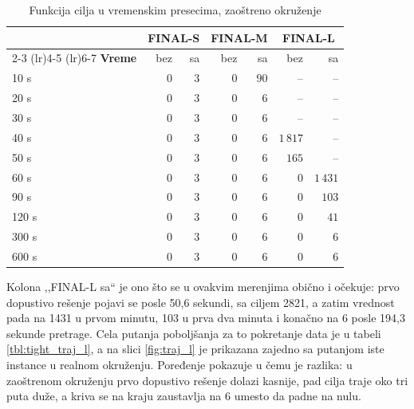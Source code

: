 \documentclass[12pt,oneside]{memoir}
\begin{document}
\begin{table}[ht]
\centering
\caption{Funkcija cilja u vremenskim presecima, zaoštreno okruženje}
\label{tbl:tight_checkpoints}
\begin{tabular}{lrrrrrr}
\toprule
& \multicolumn{2}{c}{\textbf{FINAL-S}}
& \multicolumn{2}{c}{\textbf{FINAL-M}}
& \multicolumn{2}{c}{\textbf{FINAL-L}} \\
\cmidrule(lr){2-3} \cmidrule(lr){4-5} \cmidrule(lr){6-7}
\textbf{Vreme} & bez & sa & bez & sa & bez & sa \\
\midrule
10 s  & $0$ & $3$ & $0$ & $90$ & --       & --       \\
20 s  & $0$ & $3$ & $0$ & $6$  & --       & --       \\
30 s  & $0$ & $3$ & $0$ & $6$  & --       & --       \\
40 s  & $0$ & $3$ & $0$ & $6$  & $1\,817$ & --       \\
50 s  & $0$ & $3$ & $0$ & $6$  & $165$    & --       \\
60 s  & $0$ & $3$ & $0$ & $6$  & $0$      & $1\,431$ \\
90 s  & $0$ & $3$ & $0$ & $6$  & $0$      & $103$    \\
120 s & $0$ & $3$ & $0$ & $6$  & $0$      & $41$     \\
300 s & $0$ & $3$ & $0$ & $6$  & $0$      & $6$      \\
600 s & $0$ & $3$ & $0$ & $6$  & $0$      & $6$      \\
\bottomrule
\end{tabular}
\end{table}

Kolona ,,FINAL-L sa`` je ono što se u ovakvim merenjima obično i očekuje:
prvo dopustivo rešenje pojavi se posle 50,6 sekundi, sa ciljem 2821, a
zatim vrednost pada na 1431 u prvom minutu, 103 u prva dva minuta i
konačno na 6 posle 194,3 sekunde pretrage. Cela putanja poboljšanja za
to pokretanje data je u tabeli \ref{tbl:tight_traj_l}, a na slici
\ref{fig:traj_l} je prikazana zajedno sa putanjom iste instance u
realnom okruženju. Poređenje pokazuje u čemu je razlika:
u zaoštrenom okruženju prvo dopustivo rešenje dolazi kasnije, pad cilja
traje oko tri puta duže, a kriva se na kraju zaustavlja na 6 umesto da
padne na nulu.

\newcommand{\trajRealno}{
  (27.46,3095) (27.66,3053) (27.96,2999) (28.19,2947) (28.63,2824)
  (29.26,2592) (29.53,2444) (29.9,1848) (31.36,1838) (31.55,1557)
  (31.96,1386) (32.21,1380) (34.17,1072) (36.68,1026) (37.21,936)
  (38.35,880) (38.77,833) (42.26,761) (42.4,612) (42.67,606) (42.99,600)
  (43.55,555) (45.83,545) (47.16,375) (49.95,367) (50.56,300) (51.77,292)
  (53.67,270) (55.12,254) (55.81,215) (57.23,214) (57.8,136) (58.35,114)
  (61.42,113) (61.66,111) (61.89,110) (62.13,108) (62.42,105) (62.54,86)
  (63.41,84) (63.68,82) (63.97,80) (64.24,79) (64.49,77) (64.67,51)
  (64.95,49) (65.3,47) (66.01,45) (66.58,44) (67.2,42) (68.57,39)
  (68.93,38) (69.15,35) (69.86,33) (70.11,32) (70.39,29) (70.7,27)
  (70.94,26) (71.33,24) (71.94,23) (72.44,21) (72.87,20) (73.49,17)
  (74.09,16) (74.35,14) (74.61,13) (74.83,11) (75.13,9) (75.34,6)
  (75.74,5) (76.07,3) (76.35,2) (76.66,0)}
\end{document}
